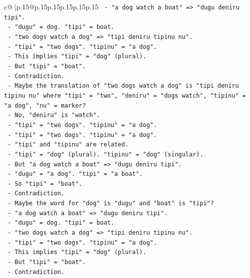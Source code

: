 \documentclass{article}
\begin{document}
{\begin{supertabular}{c@{$\;$}|p{.15\linewidth}@{}p{.15\linewidth}p{.15\linewidth}p{.15\linewidth}p{.15\linewidth}p{.15\linewidth}}
{{{\texttt{         {-} "a dog watch a boat" => "dugu deniru tipi".} \\
\texttt{           {-} "dugu" = dog. "tipi" = boat.} \\
\texttt{         {-} "two dogs watch a dog" => "tipi deniru tipinu nu".} \\
\texttt{           {-} "tipi" = "two dogs". "tipinu" = "a dog".} \\
\texttt{           {-} This implies "tipi" = "dog" (plural).} \\
\texttt{           {-} But "tipi" = "boat".} \\
\texttt{           {-} Contradiction.} \\
\texttt{       {-} Maybe the translation of "two dogs watch a dog" is "tipi deniru tipinu nu" where "tipi" = "two", "deniru" = "dogs watch", "tipinu" = "a dog", "nu" = marker?} \\
\texttt{         {-} No, "deniru" is "watch".} \\
\texttt{         {-} "tipi" = "two dogs". "tipinu" = "a dog".} \\
\texttt{         {-} "tipi" = "two dogs". "tipinu" = "a dog".} \\
\texttt{         {-} "tipi" and "tipinu" are related.} \\
\texttt{         {-} "tipi" = "dog" (plural). "tipinu" = "dog" (singular).} \\
\texttt{         {-} But "a dog watch a boat" => "dugu deniru tipi".} \\
\texttt{           {-} "dugu" = "a dog". "tipi" = "a boat".} \\
\texttt{           {-} So "tipi" = "boat".} \\
\texttt{           {-} Contradiction.} \\
\texttt{       {-} Maybe the word for "dog" is "dugu" and "boat" is "tipi"?} \\
\texttt{         {-} "a dog watch a boat" => "dugu deniru tipi".} \\
\texttt{           {-} "dugu" = dog. "tipi" = boat.} \\
\texttt{         {-} "two dogs watch a dog" => "tipi deniru tipinu nu".} \\
\texttt{           {-} "tipi" = "two dogs". "tipinu" = "a dog".} \\
\texttt{           {-} This implies "tipi" = "dog" (plural).} \\
\texttt{           {-} But "tipi" = "boat".} \\
\texttt{           {-} Contradiction.} \\
}}}
\end{supertabular}}
\end{document}
